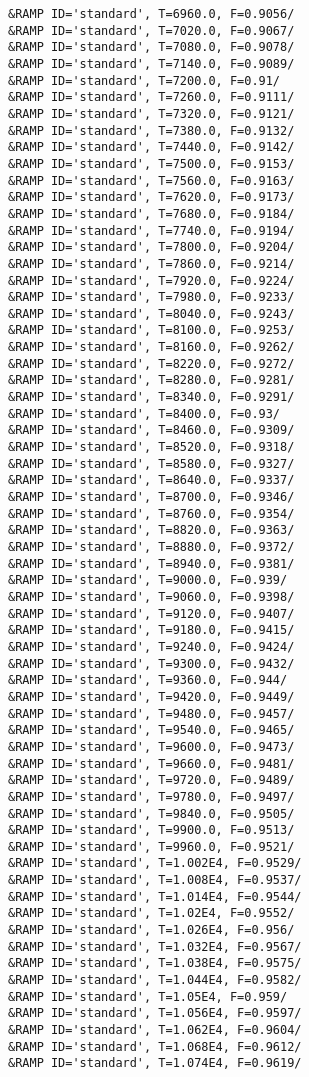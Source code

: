 \begin{lstlisting}
&RAMP ID='standard', T=6960.0, F=0.9056/
&RAMP ID='standard', T=7020.0, F=0.9067/
&RAMP ID='standard', T=7080.0, F=0.9078/
&RAMP ID='standard', T=7140.0, F=0.9089/
&RAMP ID='standard', T=7200.0, F=0.91/
&RAMP ID='standard', T=7260.0, F=0.9111/
&RAMP ID='standard', T=7320.0, F=0.9121/
&RAMP ID='standard', T=7380.0, F=0.9132/
&RAMP ID='standard', T=7440.0, F=0.9142/
&RAMP ID='standard', T=7500.0, F=0.9153/
&RAMP ID='standard', T=7560.0, F=0.9163/
&RAMP ID='standard', T=7620.0, F=0.9173/
&RAMP ID='standard', T=7680.0, F=0.9184/
&RAMP ID='standard', T=7740.0, F=0.9194/
&RAMP ID='standard', T=7800.0, F=0.9204/
&RAMP ID='standard', T=7860.0, F=0.9214/
&RAMP ID='standard', T=7920.0, F=0.9224/
&RAMP ID='standard', T=7980.0, F=0.9233/
&RAMP ID='standard', T=8040.0, F=0.9243/
&RAMP ID='standard', T=8100.0, F=0.9253/
&RAMP ID='standard', T=8160.0, F=0.9262/
&RAMP ID='standard', T=8220.0, F=0.9272/
&RAMP ID='standard', T=8280.0, F=0.9281/
&RAMP ID='standard', T=8340.0, F=0.9291/
&RAMP ID='standard', T=8400.0, F=0.93/
&RAMP ID='standard', T=8460.0, F=0.9309/
&RAMP ID='standard', T=8520.0, F=0.9318/
&RAMP ID='standard', T=8580.0, F=0.9327/
&RAMP ID='standard', T=8640.0, F=0.9337/
&RAMP ID='standard', T=8700.0, F=0.9346/
&RAMP ID='standard', T=8760.0, F=0.9354/
&RAMP ID='standard', T=8820.0, F=0.9363/
&RAMP ID='standard', T=8880.0, F=0.9372/
&RAMP ID='standard', T=8940.0, F=0.9381/
&RAMP ID='standard', T=9000.0, F=0.939/
&RAMP ID='standard', T=9060.0, F=0.9398/
&RAMP ID='standard', T=9120.0, F=0.9407/
&RAMP ID='standard', T=9180.0, F=0.9415/
&RAMP ID='standard', T=9240.0, F=0.9424/
&RAMP ID='standard', T=9300.0, F=0.9432/
&RAMP ID='standard', T=9360.0, F=0.944/
&RAMP ID='standard', T=9420.0, F=0.9449/
&RAMP ID='standard', T=9480.0, F=0.9457/
&RAMP ID='standard', T=9540.0, F=0.9465/
&RAMP ID='standard', T=9600.0, F=0.9473/
&RAMP ID='standard', T=9660.0, F=0.9481/
&RAMP ID='standard', T=9720.0, F=0.9489/
&RAMP ID='standard', T=9780.0, F=0.9497/
&RAMP ID='standard', T=9840.0, F=0.9505/
&RAMP ID='standard', T=9900.0, F=0.9513/
&RAMP ID='standard', T=9960.0, F=0.9521/
&RAMP ID='standard', T=1.002E4, F=0.9529/
&RAMP ID='standard', T=1.008E4, F=0.9537/
&RAMP ID='standard', T=1.014E4, F=0.9544/
&RAMP ID='standard', T=1.02E4, F=0.9552/
&RAMP ID='standard', T=1.026E4, F=0.956/
&RAMP ID='standard', T=1.032E4, F=0.9567/
&RAMP ID='standard', T=1.038E4, F=0.9575/
&RAMP ID='standard', T=1.044E4, F=0.9582/
&RAMP ID='standard', T=1.05E4, F=0.959/
&RAMP ID='standard', T=1.056E4, F=0.9597/
&RAMP ID='standard', T=1.062E4, F=0.9604/
&RAMP ID='standard', T=1.068E4, F=0.9612/
&RAMP ID='standard', T=1.074E4, F=0.9619/

\end{lstlisting}
